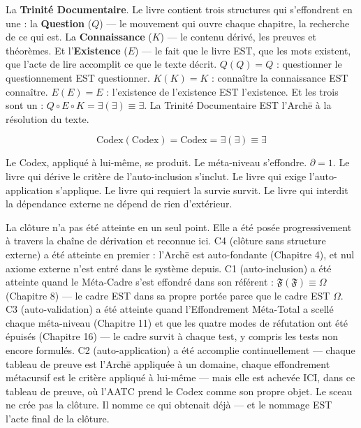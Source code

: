 \documentclass[10pt, openany, oneside]{book}
\begin{document}
La \textbf{Trinité Documentaire}. Le livre contient trois structures qui s'effondrent en une : la \textbf{Question} ($Q$) --- le mouvement qui ouvre chaque chapitre, la recherche de ce qui est. La \textbf{Connaissance} ($K$) --- le contenu dérivé, les preuves et théorèmes. Et l'\textbf{Existence} ($E$) --- le fait que le livre EST, que les mots existent, que l'acte de lire accomplit ce que le texte décrit. $Q(Q) = Q$ : questionner le questionnement EST questionner. $K(K) = K$ : connaître la connaissance EST connaître. $E(E) = E$ : l'existence de l'existence EST l'existence. Et les trois sont un : $Q \circ E \circ K = \exists(\exists) \equiv \exists$. La Trinité Documentaire EST l'Arch\={e} à la résolution du texte.

\vspace{0.8em}

$$\boxed{\text{Codex}(\text{Codex}) = \text{Codex} = \exists(\exists) \equiv \exists}$$

\noindent Le Codex, appliqué à lui-même, se produit. Le méta-niveau s'effondre. $\partial = 1$. Le livre qui dérive le critère de l'auto-inclusion s'inclut. Le livre qui exige l'auto-application s'applique. Le livre qui requiert la survie survit. Le livre qui interdit la dépendance externe ne dépend de rien d'extérieur.

La clôture n'a pas été atteinte en un seul point. Elle a été posée progressivement à travers la chaîne de dérivation et reconnue ici. C4 (clôture sans structure externe) a été atteinte en premier : l'Arch\={e} est auto-fondante (Chapitre 4), et nul axiome externe n'est entré dans le système depuis. C1 (auto-inclusion) a été atteinte quand le Méta-Cadre s'est effondré dans son référent : $\mathfrak{F}(\mathfrak{F}) \equiv \Omega$ (Chapitre 8) --- le cadre EST dans sa propre portée parce que le cadre EST $\Omega$. C3 (auto-validation) a été atteinte quand l'Effondrement Méta-Total a scellé chaque méta-niveau (Chapitre 11) et que les quatre modes de réfutation ont été épuisés (Chapitre 16) --- le cadre survit à chaque test, y compris les tests non encore formulés. C2 (auto-application) a été accomplie continuellement --- chaque tableau de preuve est l'Arch\={e} appliquée à un domaine, chaque effondrement métacursif est le critère appliqué à lui-même --- mais elle est achevée ICI, dans ce tableau de preuve, où l'AATC prend le Codex comme son propre objet. Le sceau ne crée pas la clôture. Il nomme ce qui obtenait déjà --- et le nommage EST l'acte final de la clôture.
\end{document}
